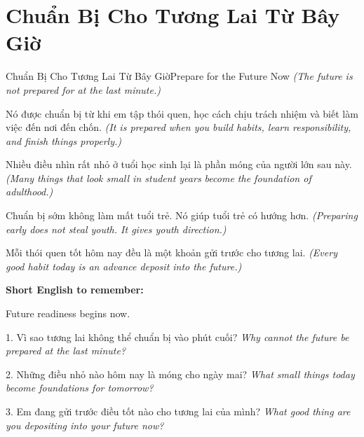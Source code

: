 \section{Chuẩn Bị Cho Tương Lai Từ Bây Giờ}
\begin{truyen}{Chuẩn Bị Cho Tương Lai Từ Bây Giờ}{Prepare for the Future Now}
\textit{(The future is not prepared for at the last minute.)}

Nó được chuẩn bị từ khi em tập thói quen, học cách chịu trách nhiệm và biết làm việc đến nơi đến chốn.
\textit{(It is prepared when you build habits, learn responsibility, and finish things properly.)}

Nhiều điều nhìn rất nhỏ ở tuổi học sinh lại là phần móng của người lớn sau này.
\textit{(Many things that look small in student years become the foundation of adulthood.)}

Chuẩn bị sớm không làm mất tuổi trẻ. Nó giúp tuổi trẻ có hướng hơn.
\textit{(Preparing early does not steal youth. It gives youth direction.)}
\end{truyen}

\begin{baihoc}
Mỗi thói quen tốt hôm nay đều là một khoản gửi trước cho tương lai.
\textit{(Every good habit today is an advance deposit into the future.)}
\end{baihoc}

\begin{ghinhoanh}
\textbf{Short English to remember:}

Future readiness begins now.

\end{ghinhoanh}

\begin{tuhocnhanh}
1. Vì sao tương lai không thể chuẩn bị vào phút cuối? \textit{Why cannot the future be prepared at the last minute?}

2. Những điều nhỏ nào hôm nay là móng cho ngày mai? \textit{What small things today become foundations for tomorrow?}

3. Em đang gửi trước điều tốt nào cho tương lai của mình? \textit{What good thing are you depositing into your future now?}
\end{tuhocnhanh}
\ngancach

